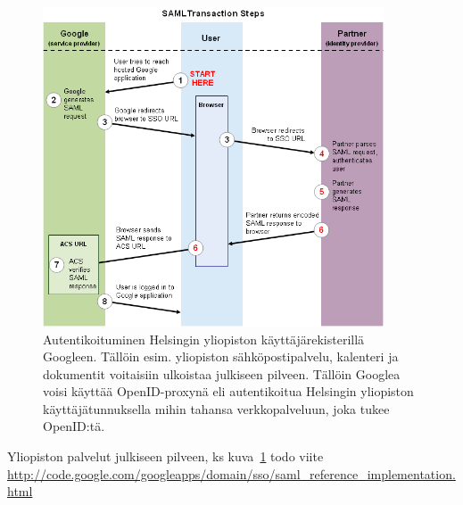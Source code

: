 \documentclass[finnish,gradu]{tktltiki}
\begin{document}
    \begin{figure}[h!]
      \centering
      \includegraphics[width=0.9\textwidth]{images/google_saml_workflow_vertical.png}
      \caption{Autentikoituminen Helsingin yliopiston käyttäjärekisterillä Googleen. Tällöin esim. yliopiston sähköpostipalvelu, kalenteri ja dokumentit voitaisiin ulkoistaa julkiseen pilveen. Tällöin Googlea voisi käyttää OpenID-proxynä eli autentikoitua Helsingin yliopiston käyttäjätunnuksella mihin tahansa verkkopalveluun, joka tukee OpenID:tä.}
      \label{fig:hy_julkiseen_pilveen}
    \end{figure}

    Yliopiston palvelut julkiseen pilveen, ks kuva~\ref{fig:hy_julkiseen_pilveen}
    todo viite \url{http://code.google.com/googleapps/domain/sso/saml_reference_implementation.html}








\lastpage
\end{document}
